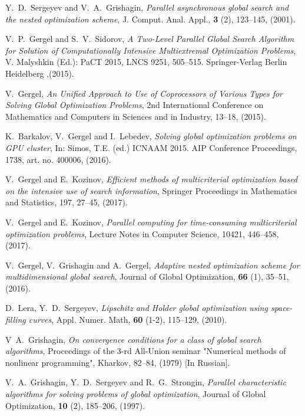 \documentclass[
11pt,%
tightenlines,%
twoside,%
onecolumn,%
nofloats,%
nobibnotes,%
nofootinbib,%
superscriptaddress,%
noshowpacs,%
centertags]%
{revtex4}
\begin{document}
\begin{thebibliography}{20}
Y.~D.~Sergeyev and V.~A.~Grishagin, \textit{Parallel asynchronous global search and the nested optimization scheme}, J. Comput. Anal. Appl., \textbf{3} (2), 123--145, (2001).

V.~P.~Gergel and S.~V.~Sidorov, \textit{A Two-Level Parallel Global Search Algorithm for Solution of Computationally Intensive Multiextremal Optimization Problems}, V. Malyshkin (Ed.): PaCT 2015, LNCS 9251, 505--515. Springer-Verlag Berlin Heidelberg ,(2015).

V.~Gergel, \textit{An Unified Approach to Use of Coprocessors of Various Types for Solving Global Optimization Problems}, 2nd International Conference on Mathematics and Computers in Sciences and in Industry, 13--18, (2015).

K.~Barkalov, V.~Gergel and I.~Lebedev, \textit{Solving global optimization problems on GPU cluster}, In: Simos, T.E. (ed.) ICNAAM 2015. AIP Conference Proceedings, 1738, art. no. 400006, (2016).

V.~Gergel and E.~Kozinov, \textit{Efficient methods of multicriterial optimization based on the intensive use of search information}, Springer Proceedings in Mathematics and Statistics, 197, 27--45, (2017). 

V.~Gergel and E.~Kozinov, \textit{Parallel computing for time-consuming multicriterial optimization problems}, Lecture Notes in Computer Science, 10421, 446--458, (2017).

V.~Gergel, V.~Grishagin and A.~Gergel, \textit{Adaptive nested optimization scheme for multidimensional global search}, Journal of Global Optimization, \textbf{66} (1), 35--51, (2016).

D.~Lera, Y.~D.~Sergeyev, \textit{Lipschitz and Holder global optimization using space-filling curves}, Appl. Numer. Math, \textbf{60} (1-2), 115--129, (2010).

V~A.~Grishagin, \textit{On convergence conditions for a class of global search algorithms}, Proceedings of the 3-rd All-Union seminar "Numerical methods of nonlinear programming", Kharkov, 82--84, (1979) [In Russian].

V.~A.~Grishagin, Y.~D.~Sergeyev and R.~G.~Strongin, \textit{Parallel characteristic algorithms for solving problems of global optimization}, Journal of Global Optimization, \textbf{10} (2), 185--206, (1997).


\end{thebibliography}
\end{document}
